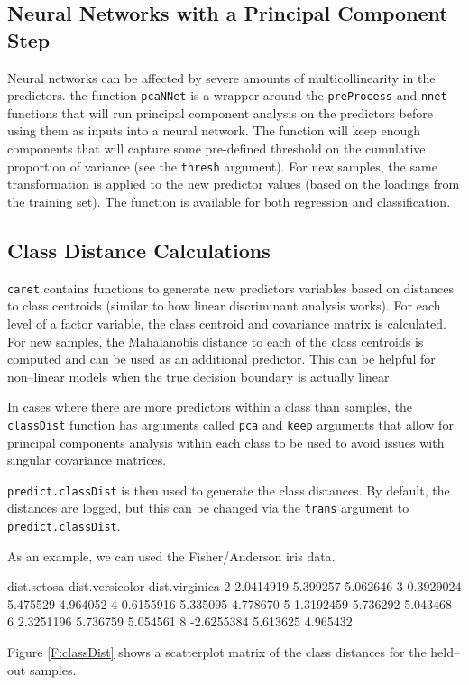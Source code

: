 \documentclass[12pt]{article}
\begin{document}
\subsection{Neural Networks with a Principal Component Step}

Neural networks can be affected by severe amounts of multicollinearity in the predictors. the function \texttt{pcaNNet} is a wrapper around the \texttt{preProcess} and \texttt{nnet} functions that will run principal component analysis on the predictors before using them as inputs into a neural network. The function will keep enough components that will capture some pre-defined threshold on the cumulative proportion of variance (see the \texttt{thresh} argument). For new samples, the same transformation is applied to the new predictor values (based on the loadings from the training set). The function is available for both regression and classification. 

\subsection{Class Distance Calculations}

\texttt{caret} contains functions to generate new predictors variables based on distances to class centroids (similar to how linear discriminant analysis works). For each level of a factor variable, the class centroid and covariance matrix is calculated. For new samples, the Mahalanobis distance to each of the class centroids is computed and can be used as an additional predictor. This can be helpful for non--linear models when the true decision boundary is actually linear.

In cases where there are more predictors within a class than samples, the \texttt{classDist} function has arguments called \texttt{pca} and \texttt{keep} arguments that allow for principal components analysis within each class to be used to avoid issues with singular covariance matrices. 

\texttt{predict.classDist} is then used to generate the class distances. By default, the distances are logged, but this can be changed via the \texttt{trans} argument to \texttt{predict.classDist}.

As an example, we can used the Fisher/Anderson iris data. 
\begin{Schunk}
\begin{Soutput}
  dist.setosa dist.versicolor dist.virginica
2   2.0414919        5.399257       5.062646
3   0.3929024        5.475529       4.964052
4   0.6155916        5.335095       4.778670
5   1.3192459        5.736292       5.043468
6   2.3251196        5.736759       5.054561
8  -2.6255384        5.613625       4.965432
\end{Soutput}
\end{Schunk}
Figure \ref{F:classDist} shows a scatterplot matrix of the class distances for the held--out samples. 
\end{document}
